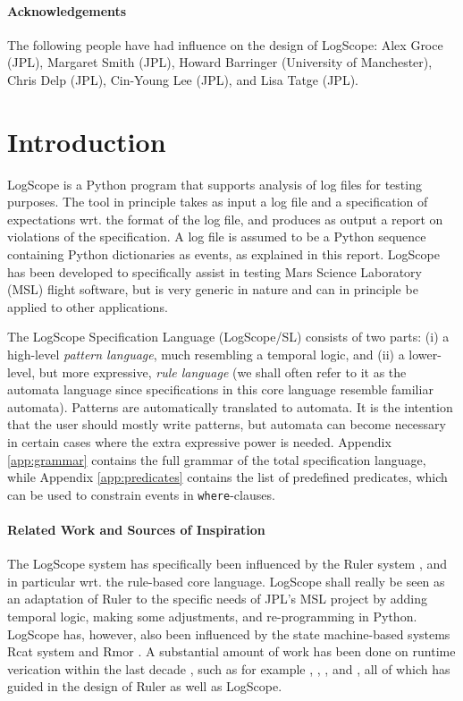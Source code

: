\documentclass{report}
\newcommand{\python}{{\sc Python}}
\newcommand{\logscope}{{\sc LogScope}}
\newcommand{\logscopeSL}{{\sc LogScope/SL}}
\newcommand{\ruler}{{\sc Ruler}}
\newcommand{\rmor}{{\sc Rmor}}
\newcommand{\rcat}{{\sc Rcat}}
\begin{document}
\subsubsection*{Acknowledgements} The following people have had influence on the design of LogScope: Alex Groce (JPL), Margaret Smith (JPL), Howard Barringer (University of Manchester), Chris Delp (JPL), Cin-Young Lee (JPL), and Lisa Tatge (JPL).

\newpage
\tableofcontents

\chapter{Introduction}

\logscope{} is a \python{} program that supports analysis of log files for testing purposes. The tool
in principle takes as input a log file and a specification of expectations wrt. the format of the log file,
and produces as output a report on violations of the specification. A log file is assumed to be a \python{}
sequence containing \python{} dictionaries as events, as explained in this report.
\logscope{} has been developed to specifically assist in testing Mars Science Laboratory (MSL) 
flight software, but is very generic in nature and can in principle be applied to other applications.

The \logscope{} Specification Language (\logscopeSL{}) consists of two parts:
(i) a high-level {\em pattern language}, much resembling a temporal logic, and
(ii) a lower-level, but more expressive, {\em rule language} (we shall often refer to it as the automata language since specifications in this core language resemble familiar automata). 
Patterns are automatically translated to automata. It is the intention that the user should
mostly write patterns, but automata can become necessary in certain cases where the
extra expressive power is needed.
Appendix \ref{app:grammar} contains the full grammar of the total specification language, while
Appendix \ref{app:predicates} contains the list of predefined predicates, which can be used to constrain
events in {\tt where}-clauses.

\subsubsection*{Related Work and Sources of Inspiration}

The \logscope{} system has specifically been influenced by the \ruler{} system
\cite{barringer-ruler-07,barringer-ruler-journal-08,barringer-tutorial-08}, 
and in particular wrt. the rule-based core language. \logscope{} shall really be seen as an adaptation of \ruler{}
to the specific needs of JPL's MSL project by adding temporal logic, making some adjustments, and re-programming in
\python. \logscope{} has, however, also been influenced by
the state machine-based  systems \rcat{} system \cite{smith-havelund-rcat-08} and  \rmor{} \cite{havelund-rmor-08}.
A substantial amount of work has been done on runtime verication within the last decade
\cite{rv}, such as for example \cite{java-mac01}, \cite{statl-01}, \cite{chen-rosu-2007-oopsla}, and \cite{havelund-rosu03c}, all of which has guided in the design of \ruler{} as well as \logscope{}.
 
\end{document}

